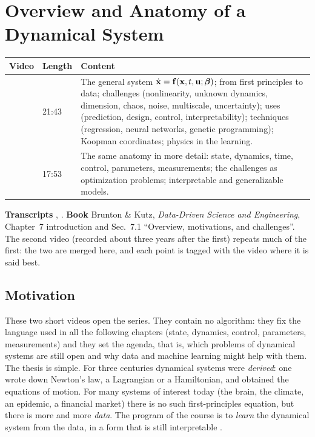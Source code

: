 \chapter{Overview and Anatomy of a Dynamical System}\label{ch:overview}
\begin{paracol}{2}

\begin{sources}
\begin{tabularx}{\linewidth}{@{}l l L@{}}
\toprule
\textbf{Video} & \textbf{Length} & \textbf{Content}\\
\midrule
{} & 21:43 & The general system $\dot{\mathbf{x}}=\mathbf{f}(\mathbf{x},t,\mathbf{u};\boldsymbol\beta)$; from first principles to data; challenges (nonlinearity, unknown dynamics, dimension, chaos, noise, multiscale, uncertainty); uses (prediction, design, control, interpretability); techniques (regression, neural networks, genetic programming); Koopman coordinates; physics in the learning.\\
 & 17:53 & The same anatomy in more detail: state, dynamics, time, control, parameters, measurements; the challenges as optimization problems; interpretable and generalizable models.\\
\bottomrule
\end{tabularx}

\smallskip
\textbf{Transcripts} , .
\textbf{Book} Brunton \& Kutz, \emph{Data-Driven Science and Engineering}, Chapter~7 introduction and
Sec.~7.1 ``Overview, motivations, and challenges''. The second video (recorded about three years after
the first) repeats much of the first: the two are merged here, and each point is tagged with the
video where it is said best.
\end{sources}

\section*{Motivation}
These two short videos open the series. They contain no algorithm: they fix the language used in all
the following chapters (state, dynamics, control, parameters, measurements) and they set the agenda,
that is, which problems of dynamical systems are still open and why data and machine learning might
help with them. The thesis is simple. For three centuries dynamical systems were \emph{derived}: one
wrote down Newton's law, a Lagrangian or a Hamiltonian, and obtained the equations of motion. For many
systems of interest today (the brain, the climate, an epidemic, a financial market) there is no such
first-principles equation, but there is more and more \emph{data}. The program of the course is to
\emph{learn} the dynamical system from the data, in a form that is still interpretable
.


\end{paracol}

